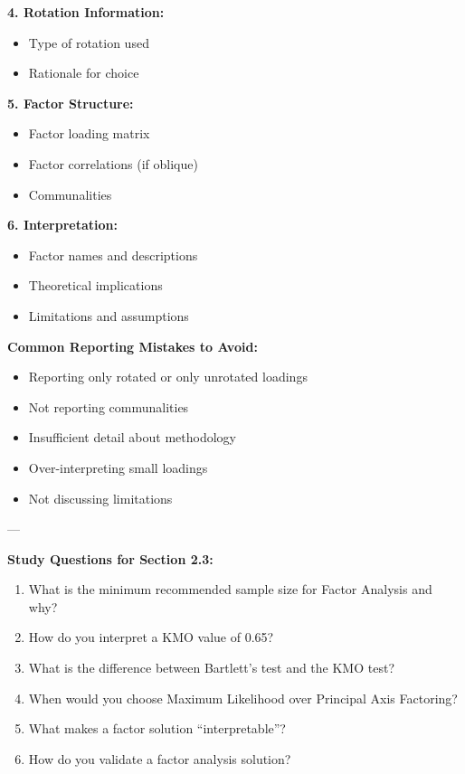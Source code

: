 \documentclass[
]{article}
\begin{document}
\textbf{4. Rotation Information:}

\begin{itemize}
\item
  Type of rotation used
\item
  Rationale for choice
\end{itemize}

\textbf{5. Factor Structure:}

\begin{itemize}
\item
  Factor loading matrix
\item
  Factor correlations (if oblique)
\item
  Communalities
\end{itemize}

\textbf{6. Interpretation:}

\begin{itemize}
\item
  Factor names and descriptions
\item
  Theoretical implications
\item
  Limitations and assumptions
\end{itemize}

\textbf{Common Reporting Mistakes to Avoid:}

\begin{itemize}
\item
  Reporting only rotated or only unrotated loadings
\item
  Not reporting communalities
\item
  Insufficient detail about methodology
\item
  Over-interpreting small loadings
\item
  Not discussing limitations
\end{itemize}

---

\textbf{Study Questions for Section 2.3:}

\begin{enumerate}
\item
  What is the minimum recommended sample size for Factor Analysis and
  why?
\item
  How do you interpret a KMO value of 0.65?
\item
  What is the difference between Bartlett's test and the KMO test?
\item
  When would you choose Maximum Likelihood over Principal Axis
  Factoring?
\item
  What makes a factor solution ``interpretable''?
\item
  How do you validate a factor analysis solution?
\end{enumerate}
\end{document}
